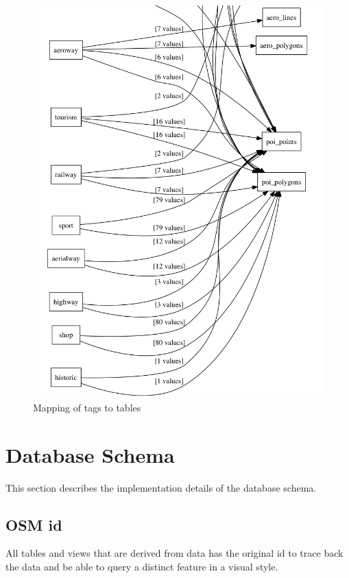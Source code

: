 \begin{figure}[H]
\centering
  \includegraphics[width=1\textwidth]{images/mapping_keys.png}
  \caption{Mapping of tags to tables}
\end{figure}
\newpage

\section{Database Schema}

This section describes the implementation details of the database schema.

\subsection{OSM id}
All tables and views that are derived from \osm{} data has the original id\cite{82_wiki.openstreetmap.org_2015}
to trace back the data and be able to query a distinct \osm{} feature in a visual style.

